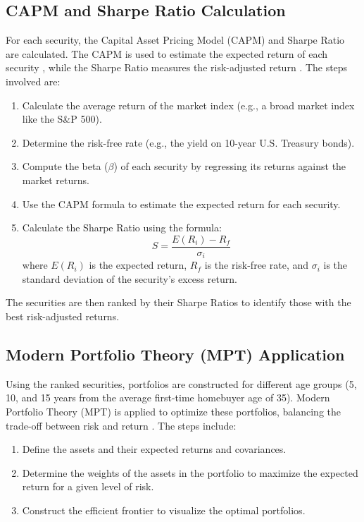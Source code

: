\subsection{CAPM and Sharpe Ratio Calculation}
For each security, the Capital Asset Pricing Model (CAPM) and Sharpe Ratio are calculated. The CAPM is used to estimate the expected return of each security \citep{wikiSML}, while the Sharpe Ratio measures the risk-adjusted return \citep{sharpe1966mutual}. The steps involved are:
\begin{enumerate}
    \item Calculate the average return of the market index (e.g., a broad market index like the S\&P 500).
    \item Determine the risk-free rate (e.g., the yield on 10-year U.S. Treasury bonds).
    \item Compute the beta ($\beta$) of each security by regressing its returns against the market returns.
    \item Use the CAPM formula to estimate the expected return for each security.
    \item Calculate the Sharpe Ratio using the formula:
    \[
    S = \frac{E(R_i) - R_f}{\sigma_i}
    \]
    where \( E(R_i) \) is the expected return, \( R_f \) is the risk-free rate, and \( \sigma_i \) is the standard deviation of the security’s excess return.
\end{enumerate}

The securities are then ranked by their Sharpe Ratios to identify those with the best risk-adjusted returns.

\subsection{Modern Portfolio Theory (MPT) Application}
Using the ranked securities, portfolios are constructed for different age groups (5, 10, and 15 years from the average first-time homebuyer age of 35). Modern Portfolio Theory (MPT) is applied to optimize these portfolios, balancing the trade-off between risk and return \citep{markowitz1952portfolio}. The steps include:
\begin{enumerate}
    \item Define the assets and their expected returns and covariances.
    \item Determine the weights of the assets in the portfolio to maximize the expected return for a given level of risk.
    \item Construct the efficient frontier to visualize the optimal portfolios.
\end{enumerate}

